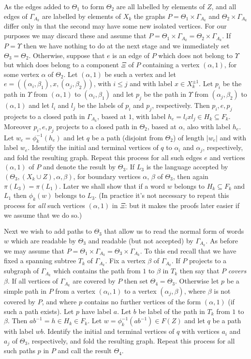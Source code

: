 \documentclass[a4paper,12pt]{article}
\renewcommand{\a}{\alpha }
\renewcommand{\b}{\beta }
\newcommand{\G}{\Gamma }
\newcommand{\T}{\Theta }
\newcommand{\U}{\Upsilon }
\numberwithin{equation}{section}
\numberwithin{figure}{section}
\begin{document}
As the edges added to $\T_1$ to form $\T_2$ are all labelled by elements 
of $Z$, and all edges of $\G_{A_k}$ are labelled by elements of $X_k$ 
the graphs $P=\T_1\times \G_{A_k}$ and $\T_2\times \G_{A_k}$ differ only
in that the second may have some new isolated vertices. For our purposes
we may discard these and assume that $P=\T_1\times \G_{A_k}=
 \T_2\times \G_{A_k}$. If $P=\U$ then we have nothing to do at the
next stage and we immediately set $\T_3=\T_2$. Otherwise, 
suppose that $e$ is an edge of $P$ which does not belong to $\U$ but
which does belong to a component $\Xi$  of $P$ containing a vertex
$(\a,1)$, for some vertex $\a$ of $\T_2$. 
Let $(\a,1)$ be such a vertex and let 
$e=((\a_i,\b_1), x, (\a_j,\b_2))$, 
with $i\le j$ and with label $x\in X_k^{\pm 1}$. 
 Let $p_i$ be   
the path in $\U$ from $(\a,1)$ to $(\a_i,\b_1)$ and let $p_j$ be
the path in $\U$ from  $(\a_j,\b_2)$ to $(\a,1)$ and 
let $l_i$ and $l_j$ be the labels of $p_i$ and $p_j$, respectively. Then 
$p_i,e,p_j$ projects to a closed path in $\G_{A_k}$, based at $1$, with
label $h_e=l_i x l_j \in H_k\subseteq F_k$. Moreover   
$p_i,e,p_j$ projects to a closed path in $\T_2$, based at $\a$, also 
with label $h_e$. Let 
$w_e=\phi_k^{-1}(h_e)$ and let 
$q$ be a path (disjoint from $\T_2$) of length
$|w_e|$ and with label $w_e$. Identify the initial and terminal 
vertices of $q$ to $\a_i$ and $\a_j$, respectively, and fold the
resulting graph. Repeat this process for all such edges $e$ and 
vertices $(\a,1)$ of $P$
and denote the result by $\T_3$. If 
$L_3$ is the
language accepted by $(\T_3,(X_k\cup Z), \a,\b)$, for boundary
vertices $\a$, $\b$ of $\T_3$, then again $\pi(L_3)=\pi(L_1)$. 
Later we shall show that if a word $w$ belongs to $H_k\subseteq F_k$ and 
$L_1$ then
$\phi_k(w)$ belongs to $L_3$. (In practice it's not necessary to 
repeat this process for {\em all} such vertices $(\a,1)$ in $\Xi$: but it
makes the proofs later easier if we assume that we do so.)

Next we wish to add paths to $\T_3$ that allow us to read the normal
form of words $w$ which are readable by $\T_3$ and readable 
(but not accepted) by $\G_{A_k}$.  
As before we may assume that
$P=\T_1\times \G_{A_k}=
 \T_3\times \G_{A_k}$. 
To this end recall that we have fixed a spanning subtree 
$T_k$ of $\G_{A_k}$. Fix a vertex $\b$ of $\G_{A_k}$.  
 If $P$ projects to a subgraph of $\G_{A_k}$ which contains 
the path from $1$ to $\b$ in $T_k$ then say that $P$ {\em covers} $\b$. 
If all vertices of $\G_{A_k}$ are covered by $P$ then set $\T_4=\T_3$.
Otherwise 
let $p$ be a simple path in $P$ from a  vertex $(\a_i,1)$ to a vertex $(\a_j,\b)$, 
where $\b$ is not covered by $P$, and where $p$ contains no further
vertices of the form $(\a,1)$ (if such a path exists). Let 
$p$ have label $a$.  
Let $b$ be label of the path in $T_k$ from $1$ to $\b$. 
Then $ab^{-1}=h\in H_k\in F_k$. Let 
$w=\phi_{k}^{-1}(ab^{-1})
\in F(Z)$ and let $q$ be a path with label $wb$. Identify the initial
and terminal vertices of $q$ with vertices $a_i$ and $a_j$ of $\T_3$, 
respectively, and fold
the resulting graph. Repeat this process for all such paths $p$ in $P$ and 
call the result $\T_4$. 
\end{document}
